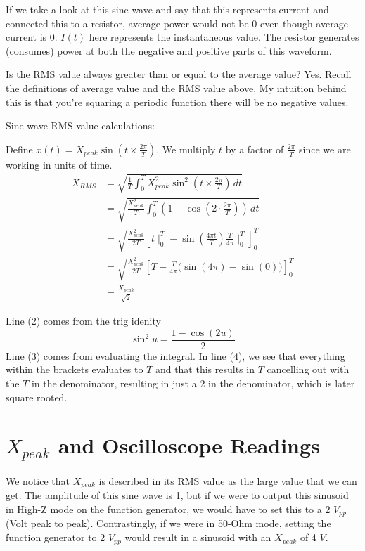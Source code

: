 If we take a look at this sine wave and say that this represents current and connected this to a resistor, average power would not be 0 even though average current is 0. $I(t)$ here represents the instantaneous value. The resistor generates (consumes) power at both the negative and positive parts of this waveform.



\begin{sanity}
    Is the RMS value always greater than or equal to the average value? Yes. Recall the definitions of average value and the RMS value above. My intuition behind this is that you're squaring a periodic function there will be no negative values.
\end{sanity}

Sine wave RMS value calculations:

Define $x(t) = X_{peak} \sin{(t \times \frac{2\pi}{T})}$. We multiply $t$ by a factor of $\frac{2\pi}{T}$ since we are working in units of time.
\begin{align*} 
    X_{RMS} &= \sqrt{\frac{1}{T} \int_0^T X_{peak}^2 \sin^2{(t \times \frac{2\pi}{T})} \,dt} \tag{1} \\
    &= \sqrt{\frac{X_{peak}^2}{T} \int_0^T (1-\cos{(2\cdot \frac{2\pi}{T})}) \,dt} \tag{2} \\
    &= \sqrt{\frac{X_{peak}^2}{2T} \left[t \mid_0^T - \sin{(\frac{4\pi t}{T})\frac{T}{4\pi} \mid_0^T}\right]_0^T} \tag{3} \\ 
    &= \sqrt{\frac{X_{peak}^2}{2T} \left[T - \frac{T}{4\pi}(\sin{(4\pi) - \sin{(0))}}\right]_0^T} \tag{4} \\
    &= \frac{X_{peak}}{\sqrt{2}} \tag{5}
\end{align*}

Line (2) comes from the trig idenity 
    \[\sin^2{u} = \frac{1-\cos{(2u)}}{2}\]
Line (3) comes from evaluating the integral. In line (4), we see that everything within the brackets evaluates to $T$ and that this results in $T$ cancelling out with the $T$ in the denominator, resulting in just a 2 in the denominator, which is later square rooted.

\section{$X_{peak}$ and Oscilloscope Readings}
We notice that $X_{peak}$ is described in its RMS value as the large value that we can get. The amplitude of this sine wave is 1, but if we were to output this sinusoid in High-Z mode on the function generator, we would have to set this to a 2 $V_{pp}$ (Volt peak to peak). Contrastingly, if we were in 50-Ohm mode, setting the function generator to 2 $V_{pp}$ would result in a sinusoid with an $X_{peak}$ of 4 $V$.

